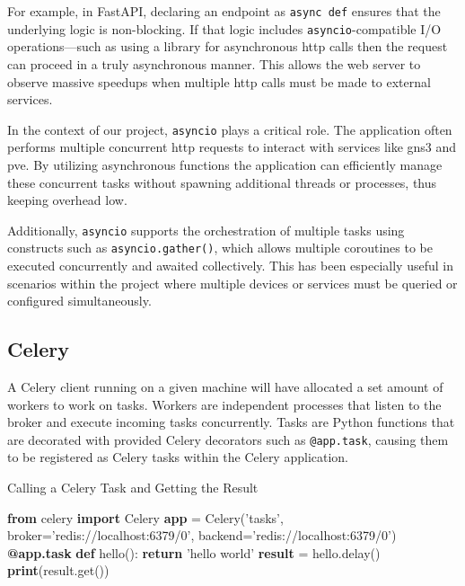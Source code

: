   For example, in FastAPI, declaring an endpoint as \texttt{async def} ensures that the underlying logic is non-blocking. 
  If that logic includes \texttt{asyncio}-compatible I/O operations—such as using a library for asynchronous \ac{http} calls 
  then the request can proceed in a truly asynchronous manner. This allows the web server to observe massive speedups when
  multiple \ac{http} calls must be made to external services.

  In the context of our project, \texttt{asyncio} plays a critical role. The application often performs multiple concurrent 
  \ac{http} requests to interact with services like \ac{gns3} and \ac{pve}. By utilizing asynchronous functions the application 
  can efficiently manage these concurrent tasks without spawning additional threads or processes, thus keeping overhead low.

  Additionally, \texttt{asyncio} supports the orchestration of multiple tasks using constructs such as \texttt{asyncio.gather()}, 
  which allows multiple coroutines to be executed concurrently and awaited collectively. This has been especially useful in 
  scenarios within the project where multiple devices or services must be queried or configured simultaneously.

\subsection{Celery}

  A Celery client running on a given machine will have allocated a set amount of workers to work on tasks. Workers are 
  independent processes that listen to the broker and execute incoming tasks concurrently. Tasks are Python functions that 
  are decorated with provided Celery decorators such as \texttt{@app.task}, causing them to be registered as Celery tasks 
  within the Celery application.

  \begin{algorithm}
    \caption{Calling a Celery Task and Getting the Result}\label{celery-call-result}
    \begin{algorithmic}[1]
      \State \textbf{from} celery \textbf{import} Celery
      \State
      \State \textbf{app} = Celery('tasks', broker='redis://localhost:6379/0', backend='redis://localhost:6379/0')
      \State
      \State \textbf{@app.task}
      \State \textbf{def} hello():
      \State \hspace{1em} \textbf{return} 'hello world'
      \State
      \State \textbf{result} = hello.delay()
      \State \textbf{print}(result.get())
    \end{algorithmic}
  \end{algorithm}

